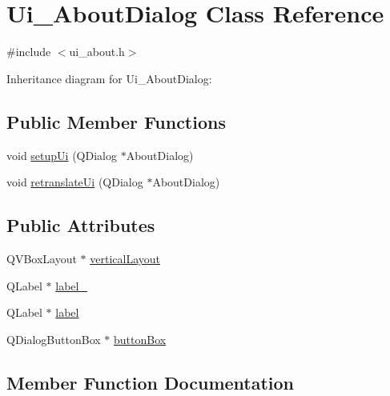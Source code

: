 \hypertarget{class_ui___about_dialog}{}\section{Ui\+\_\+\+About\+Dialog Class Reference}
\label{class_ui___about_dialog}


{\ttfamily \#include $<$ui\+\_\+about.\+h$>$}



Inheritance diagram for Ui\+\_\+\+About\+Dialog\+:
\subsection*{Public Member Functions}
\begin{DoxyCompactItemize}
\item 
void \hyperlink{class_ui___about_dialog_a702ca02e273e8027249b3b482e12e4d6}{setup\+Ui} (Q\+Dialog $\ast$About\+Dialog)
\item 
void \hyperlink{class_ui___about_dialog_a631c82f90dbffd49e4be4f1b4aa2a688}{retranslate\+Ui} (Q\+Dialog $\ast$About\+Dialog)
\end{DoxyCompactItemize}
\subsection*{Public Attributes}
\begin{DoxyCompactItemize}
\item 
Q\+V\+Box\+Layout $\ast$ \hyperlink{class_ui___about_dialog_ad9a707b99263cd8c14df8bc5ea562255}{vertical\+Layout}
\item 
Q\+Label $\ast$ \hyperlink{class_ui___about_dialog_ac6edf91dde773e6a40f4c4df9133650d}{label\+\_}
\item 
Q\+Label $\ast$ \hyperlink{class_ui___about_dialog_aef90e46f3414866c7123194910a3eccb}{label}
\item 
Q\+Dialog\+Button\+Box $\ast$ \hyperlink{class_ui___about_dialog_a00d34e7d71d8f7f894d8de6a074ad123}{button\+Box}
\end{DoxyCompactItemize}


\subsection{Member Function Documentation}
\mbox{\label{class_ui___about_dialog_a631c82f90dbffd49e4be4f1b4aa2a688}} 
